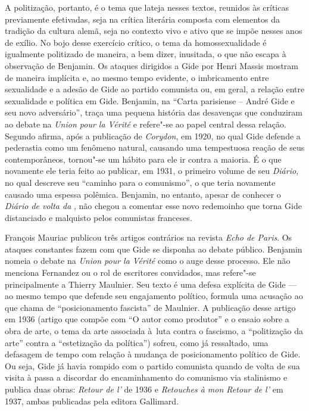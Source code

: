 A politização, portanto, é o tema que lateja nesses textos, reunidos às
críticas previamente efetivadas, seja na crítica literária composta com
elementos da tradição da cultura alemã, seja no contexto vivo e ativo
que se impõe nesses anos de exílio. No bojo desse exercício crítico, o
tema da homossexualidade é igualmente politizado de maneira, a bem
dizer, inusitada, o que não escapa à observação de Benjamin. Os ataques
dirigidos a Gide por Henri Massis mostram de maneira implícita e, ao
mesmo tempo evidente, o imbricamento entre sexualidade e a adesão de
Gide ao partido comunista ou, em geral, a relação entre sexualidade e
política em Gide. Benjamin, na ``Carta parisiense  -- André Gide e seu
novo adversário'', traça uma pequena história das desavenças que
conduziram ao debate na \emph{Union pour la Vérité} e refere"-se ao papel
central dessa relação. Segundo afirma, após a publicação de
\emph{Corydon}, em 1920, no qual Gide defende a pederastia como um
fenômeno natural, causando uma tempestuosa reação de seus
contemporâneos, tornou"-se um hábito para ele ir contra a maioria. É o
que novamente ele teria feito ao publicar, em 1931, o primeiro volume de
seu \emph{Diário}, no qual descreve seu ``caminho para o comunismo'', o
que teria novamente causado uma espessa polêmica. Benjamin, no
entanto, apesar de conhecer o \emph{Diário de volta da} , não
chegou a comentar esse novo redemoinho que torna Gide distanciado e
malquisto pelos comunistas franceses.

François Mauriac publicou três artigos contrários na revista \emph{Echo de
Paris}. Os ataques constantes fazem com que Gide se disponha ao debate
público. Benjamin nomeia o debate na \emph{Union pour la Vérité} como o
auge desse processo. Ele não menciona Fernandez ou o rol de escritores
convidados, mas refere"-se principalmente a Thierry Maulnier. Seu texto é
uma defesa explícita de Gide --- ao mesmo tempo que defende seu
engajamento político, formula uma acusação ao que chama de
``posicionamento fascista'' de Maulnier. A publicação desse artigo em
1936 (artigo que compõe com ``O autor como produtor'' e o ensaio sobre a
obra de arte, o tema da arte associada à~luta contra o fascismo, a
``politização da arte'' contra a ``estetização da política'') sofreu,
como já ressaltado, uma defasagem de tempo com relação à mudança de
posicionamento político de Gide. Ou seja, Gide já havia rompido com o
partido comunista quando de volta de sua visita à  passa a
discordar do encaminhamento do comunismo via stalinismo e publica duas
obras: \emph{Retour de l'} de 1936 e \emph{Retouches à mon
Retour de l'} em 1937, ambas publicadas pela editora Gallimard.


